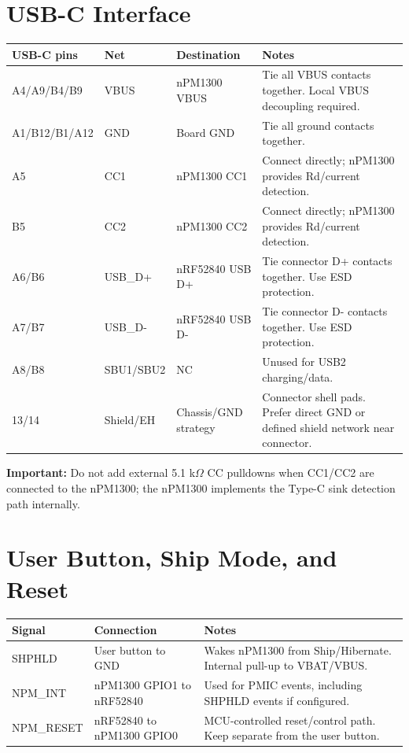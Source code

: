 \documentclass[11pt,a4paper]{article}
\begin{document}
\section{USB-C Interface}

\begin{table}[h]
\small
\begin{tabularx}{\textwidth}{lllL}
\toprule
\textbf{USB-C pins} & \textbf{Net} & \textbf{Destination} & \textbf{Notes}\\
\midrule
A4/A9/B4/B9 & VBUS & nPM1300 VBUS & Tie all VBUS contacts together. Local VBUS decoupling required.\\
A1/B12/B1/A12 & GND & Board GND & Tie all ground contacts together.\\
A5 & CC1 & nPM1300 CC1 & Connect directly; nPM1300 provides Rd/current detection.\\
B5 & CC2 & nPM1300 CC2 & Connect directly; nPM1300 provides Rd/current detection.\\
A6/B6 & USB\_D+ & nRF52840 USB D+ & Tie connector D+ contacts together. Use ESD protection.\\
A7/B7 & USB\_D- & nRF52840 USB D- & Tie connector D- contacts together. Use ESD protection.\\
A8/B8 & SBU1/SBU2 & NC & Unused for USB2 charging/data.\\
13/14 & Shield/EH & Chassis/GND strategy & Connector shell pads. Prefer direct GND or defined shield network near connector.\\
\bottomrule
\end{tabularx}
\end{table}

\textbf{Important:} Do not add external 5.1 k$\Omega$ CC pulldowns when CC1/CC2 are connected to the nPM1300; the nPM1300 implements the Type-C sink detection path internally.

\section{User Button, Ship Mode, and Reset}

\begin{table}[h]
\small
\begin{tabularx}{\textwidth}{llL}
\toprule
\textbf{Signal} & \textbf{Connection} & \textbf{Notes}\\
\midrule
SHPHLD & User button to GND & Wakes nPM1300 from Ship/Hibernate. Internal pull-up to VBAT/VBUS.\\
NPM\_INT & nPM1300 GPIO1 to nRF52840 & Used for PMIC events, including SHPHLD events if configured.\\
NPM\_RESET & nRF52840 to nPM1300 GPIO0 & MCU-controlled reset/control path. Keep separate from the user button.\\
\bottomrule
\end{tabularx}
\end{table}
\end{document}
